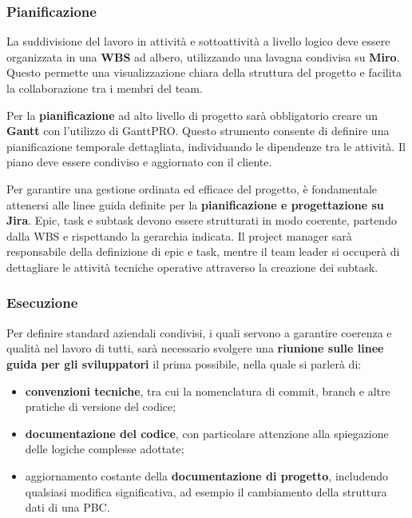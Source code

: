     \subsubsection{Pianificazione}
    La suddivisione del lavoro in attività e sottoattività a livello logico deve essere organizzata in una \textbf{\ac{WBS}} ad albero,
    utilizzando una lavagna condivisa su \textbf{Miro}. Questo permette una visualizzazione chiara della struttura del progetto e
    facilita la collaborazione tra i membri del team.

    Per la \textbf{pianificazione} ad alto livello di progetto sarà obbligatorio creare un \textbf{Gantt} con l’utilizzo di GanttPRO.
    Questo strumento consente di definire una pianificazione temporale dettagliata, individuando le dipendenze tra le attività.
    Il piano deve essere condiviso e aggiornato con il cliente.

    Per garantire una gestione ordinata ed efficace del progetto, è fondamentale attenersi alle linee guida definite per
    la \textbf{pianificazione e progettazione su Jira}. Epic, task e subtask devono essere strutturati in modo coerente,
    partendo dalla \ac{WBS} e rispettando la gerarchia indicata. Il project manager sarà responsabile della definizione di epic e task,
    mentre il team leader si occuperà di dettagliare le attività tecniche operative attraverso la creazione dei subtask.

    \subsubsection{Esecuzione}
    Per definire standard aziendali condivisi, i quali servono a garantire coerenza e qualità nel lavoro di tutti, sarà necessario
    svolgere una \textbf{riunione sulle linee guida per gli sviluppatori} il prima possibile, nella quale si parlerà di:
    \begin{itemize}
        \item \textbf{convenzioni tecniche}, tra cui la nomenclatura di commit, branch e altre pratiche di versione del codice;
        \item \textbf{documentazione del codice}, con particolare attenzione alla spiegazione delle logiche complesse adottate;
        \item aggiornamento costante della \textbf{documentazione di progetto}, includendo qualsiasi modifica significativa,
        ad esempio il cambiamento della struttura dati di una \ac{PBC}.
    \end{itemize}


